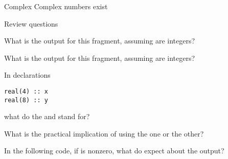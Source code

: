 \begin{block}{Complex}
  Complex numbers exist
\end{block}

 {Review questions}

\begin{exercise}
  What is the output for this fragment, assuming  are integers?
\end{exercise}

\begin{exercise}
  What is the output for this fragment, assuming  are integers?
\end{exercise}

\begin{exercise}
  \label{ex:f-elt-rev1}
  In declarations
\begin{verbatim}
real(4) :: x
real(8) :: y
\end{verbatim}
what do the  and  stand for?

What is the practical implication of using the one or the other?
\end{exercise}

\begin{exercise}
  \label{ex:f-elt-rev2}
  In the following code, if  is nonzero, what do expect about
  the output?
\end{exercise}
